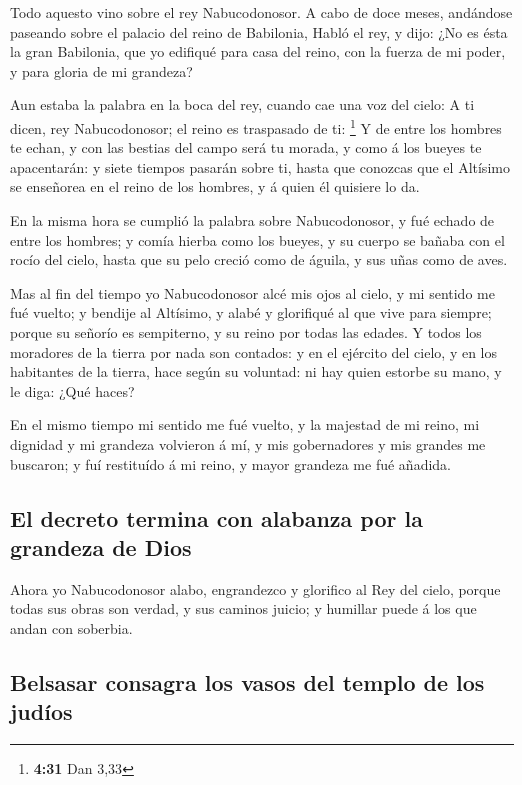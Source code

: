  Todo aquesto vino sobre el rey Nabucodonosor.
 A cabo de doce meses, andándose paseando sobre el
palacio del reino de Babilonia,  Habló el rey, y dijo:
¿No es ésta la gran Babilonia, que yo edifiqué para casa del reino, con
la fuerza de mi poder, y para gloria de mi grandeza?

 Aun estaba la palabra en la boca del rey, cuando cae una
voz del cielo: A ti dicen, rey Nabucodonosor; el reino es traspasado de
ti: \footnote{\textbf{4:31} Dan 3,33}  Y de entre los
hombres te echan, y con las bestias del campo será tu morada, y como á
los bueyes te apacentarán: y siete tiempos pasarán sobre ti, hasta que
conozcas que el Altísimo se enseñorea en el reino de los hombres, y á
quien él quisiere lo da.

 En la misma hora se cumplió la palabra sobre
Nabucodonosor, y fué echado de entre los hombres; y comía hierba como
los bueyes, y su cuerpo se bañaba con el rocío del cielo, hasta que su
pelo creció como de águila, y sus uñas como de aves.

 Mas al fin del tiempo yo Nabucodonosor alcé mis ojos al
cielo, y mi sentido me fué vuelto; y bendije al Altísimo, y alabé y
glorifiqué al que vive para siempre; porque su señorío es sempiterno, y
su reino por todas las edades.  Y todos los moradores de
la tierra por nada son contados: y en el ejército del cielo, y en los
habitantes de la tierra, hace según su voluntad: ni hay quien estorbe su
mano, y le diga: ¿Qué haces?

 En el mismo tiempo mi sentido me fué vuelto, y la
majestad de mi reino, mi dignidad y mi grandeza volvieron á mí, y mis
gobernadores y mis grandes me buscaron; y fuí restituído á mi reino, y
mayor grandeza me fué añadida.

\hypertarget{el-decreto-termina-con-alabanza-por-la-grandeza-de-dios}{%
\subsection{El decreto termina con alabanza por la grandeza de
Dios}\label{el-decreto-termina-con-alabanza-por-la-grandeza-de-dios}}

 Ahora yo Nabucodonosor alabo, engrandezco y glorifico al
Rey del cielo, porque todas sus obras son verdad, y sus caminos juicio;
y humillar puede á los que andan con soberbia.

\hypertarget{belsasar-consagra-los-vasos-del-templo-de-los-juduxedos}{%
\subsection{Belsasar consagra los vasos del templo de los
judíos}\label{belsasar-consagra-los-vasos-del-templo-de-los-juduxedos}}

